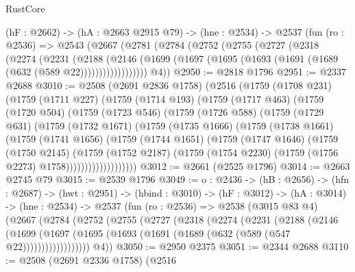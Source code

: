 \begin{lexlean}{RustCore}
\begin{coremodule}
  (hF : @2662) ->
  (hA : @2663 @2915 @79) ->
  (hne : @2534) ->
  @2537
    (fun (ro : @2536) =>
    @2543
      (@2667
        (@2781
          (@2784
            (@2752
              (@2755
                (@2727
                  (@2318
                    (@2274
                      (@2231
                        (@2188
                          (@2146
                            (@1699
                              (@1697 (@1695 (@1693 (@1691 (@1689 (@632 (@589 @22))))))))))))))))))
        @4))
@2950 := @2818 @1796
@2951 := @2337 @2688
@3010 := @2508
    (@2691 @2836 @1758)
    (@2516
      (@1759
        (@1708 @231)
        (@1759
          (@1711 @227)
          (@1759
            (@1714 @193)
            (@1759
              (@1717 @463)
              (@1759
                (@1720 @504)
                (@1759
                  (@1723 @546)
                  (@1759
                    (@1726 @588)
                    (@1759
                      (@1729 @631)
                      (@1759
                        (@1732 @1671)
                        (@1759
                          (@1735 @1666)
                          (@1759
                            (@1738 @1661)
                            (@1759
                              (@1741 @1656)
                              (@1759
                                (@1744 @1651)
                                (@1759
                                  (@1747 @1646)
                                  (@1759
                                    (@1750 @2145)
                                    (@1759
                                      (@1752 @2187)
                                      (@1759
                                        (@1754 @2230)
                                        (@1759 (@1756 @2273) @1758)))))))))))))))))))
@3012 := @2661 (@2525 @1796)
@3014 := @2663 @2745 @79
@3015 := @2539 @1796
@3049 := {o : @2436} ->
  (hB : @2656) ->
  (hfn : @2687) ->
  (hwt : @2951) ->
  (hbind : @3010) ->
  (hF : @3012) ->
  (hA : @3014) ->
  (hne : @2534) ->
  @2537
    (fun (ro : @2536) =>
    @2538
      (@3015 @83 @4)
      (@2667
        (@2784
          (@2752
            (@2755
              (@2727
                (@2318
                  (@2274
                    (@2231
                      (@2188
                        (@2146
                          (@1699
                            (@1697
                              (@1695 (@1693 (@1691 (@1689 (@632 (@589 (@547 @22))))))))))))))))))
        @4))
@3050 := @2950 @2375
@3051 := @2344 @2688
@3110 := @2508
    (@2691 @2336 @1758)
    (@2516

\end{coremodule}
\end{lexlean}
